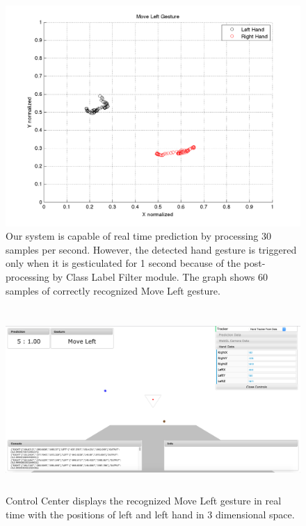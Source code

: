 \begin{figure}
	[h] \hspace{-15 mm} \centering 
	\includegraphics[width=155mm]{figures/result/test-move-left.png} \caption{Our system is capable of real time prediction by processing 30 samples per second. However, the detected hand gesture is triggered only when it is gesticulated for 1 second because of the post-processing by Class Label Filter module. The graph shows 60 samples of correctly recognized Move Left gesture. } \label{res:pl:move:left} 
\end{figure}
\begin{figure}
	[h] \centering 
	\includegraphics[height=70mm]{figures/result/cc-move-left.jpg} \caption{Control Center displays the recognized Move Left gesture in real time with the positions of left and left hand in 3 dimensional space.} \label{res:cc:move:left} 
\end{figure}
